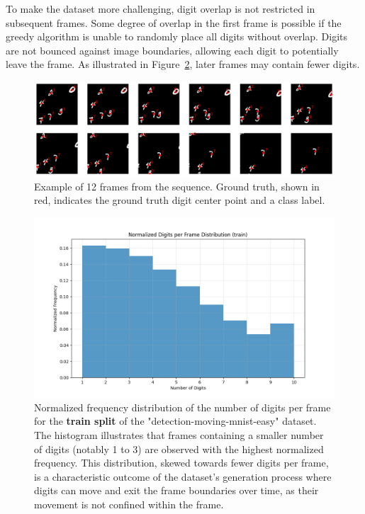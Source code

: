 To make the dataset more challenging, digit overlap is not restricted in subsequent frames. Some degree of overlap in the first frame is possible if the greedy algorithm is unable to randomly place all digits without overlap. Digits are not bounced against image boundaries, allowing each digit to potentially leave the frame. As illustrated in Figure~\ref{fig:figure_method_dataset_train_digits_per_frame}, later frames may contain fewer digits.

\begin{figure}
    \centering
    \includegraphics[width=\textwidth]{figures/figure_methods_dataset_detection_mmnist_sequence.png}
    \caption{Example of 12 frames from the sequence. Ground truth, shown in red, indicates the ground truth digit center point and a class label.}
    \label{fig:figure_methods_dataset_detection_mmnist_sequence}
\end{figure}

\begin{figure}
    \centering
    \includegraphics[width=\textwidth]{figures/figure_method_dataset_train_digits_per_frame.png}
    \caption{Normalized frequency distribution of the number of digits per frame for the \textbf{train split} of the "detection-moving-mnist-easy" dataset. The histogram illustrates that frames containing a smaller number of digits (notably 1 to 3) are observed with the highest normalized frequency. This distribution, skewed towards fewer digits per frame, is a characteristic outcome of the dataset's generation process where digits can move and exit the frame boundaries over time, as their movement is not confined within the frame.}
    \label{fig:figure_method_dataset_train_digits_per_frame}
\end{figure}

